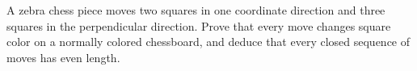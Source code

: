 A zebra chess piece moves two squares in one coordinate direction and three squares in the perpendicular direction. Prove that every move changes square color on a normally colored chessboard, and deduce that every closed sequence of moves has even length.

